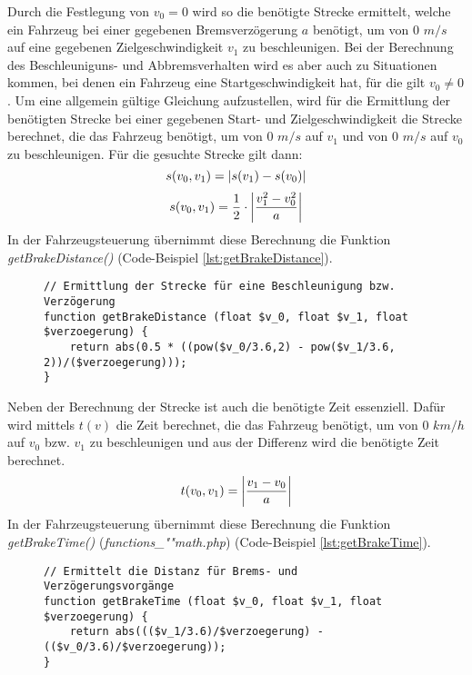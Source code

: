 Durch die Festlegung von $v_{0} = 0$ wird so die benötigte Strecke ermittelt, welche ein Fahrzeug bei einer gegebenen Bremsverzögerung $a$ benötigt, um von 0 $m/s$ auf eine gegebenen Zielgeschwindigkeit $v_{1}$ zu beschleunigen. Bei der Berechnung des Beschleuniguns- und Abbremsverhalten wird es aber auch zu Situationen kommen, bei denen ein Fahrzeug eine Startgeschwindigkeit hat, für die gilt $v_{0} \neq 0$. Um eine allgemein gültige Gleichung aufzustellen, wird für die Ermittlung der benötigten Strecke bei einer gegebenen Start- und Zielgeschwindigkeit die Strecke berechnet, die das Fahrzeug benötigt, um von 0 $m/s$ auf $v_{1}$ und von 0 $m/s$ auf $v_{0}$ zu beschleunigen. Für die gesuchte Strecke gilt dann: 
\begin{equation}
s(v_{0}, v_{1}) = \left\vert s(v_{1}) - s(v_{0})\right\vert 
\end{equation}
\begin{equation}
\label{eq:s_v_ges}
s(v_{0}, v_{1}) =\frac{1}{2} \cdot\left\vert\frac{v_{1}^{2} - v_{0}^{2}}{a}\right\vert
\end{equation}
In der Fahrzeugsteuerung übernimmt diese Berechnung die Funktion \textit{getBrakeDistance()} (Code-Beispiel \ref{lst:getBrakeDistance}). 
\begin{figure}[H]
\begin{lstlisting}[caption={\textit{getBrakeDistance$($$)$} (\textit{functions\_math.php})},captionpos=b,label={lst:getBrakeDistance}]
// Ermittlung der Strecke für eine Beschleunigung bzw. Verzögerung
function getBrakeDistance (float $v_0, float $v_1, float $verzoegerung) {
	return abs(0.5 * ((pow($v_0/3.6,2) - pow($v_1/3.6, 2))/($verzoegerung)));
}
\end{lstlisting}
\end{figure}
\noindent Neben der Berechnung der Strecke ist auch die benötigte Zeit essenziell. Dafür wird mittels $t(v)$ die Zeit berechnet, die das Fahrzeug benötigt, um von 0 $km/h$ auf $v_{0}$ bzw. $v_{1}$ zu beschleunigen und aus der Differenz wird die benötigte Zeit berechnet.
\begin{equation}
\label{eq:t_v_ges}
t(v_{0}, v_{1}) = \left\vert\frac{v_{1} - v_{0}}{a}\right\vert
\end{equation}
In der Fahrzeugsteuerung übernimmt diese Berechnung die Funktion \textit{getBrakeTime()} (\textit{func\-tions\_""math\-.php}) (Code-Beispiel \ref{lst:getBrakeTime}).
\begin{figure}[H]
\begin{lstlisting}[caption={\textit{getBrakeTime$($$)$} (\textit{functions\_math.php})},captionpos=b,label={lst:getBrakeTime}]
// Ermittelt die Distanz für Brems- und Verzögerungsvorgänge
function getBrakeTime (float $v_0, float $v_1, float $verzoegerung) {
	return abs((($v_1/3.6)/$verzoegerung) - (($v_0/3.6)/$verzoegerung));
}
\end{lstlisting}
\end{figure}
